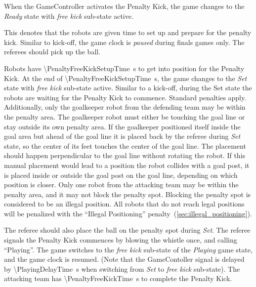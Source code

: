 When the GameController activates the Penalty Kick, the game changes to the \textit{Ready} state with \textit{free kick} sub-state active.

This denotes that the robots are given time to set up and prepare for the penalty kick.
Similar to kick-off, the game clock is \textit{paused} during finals games only.
The referees should pick up the ball.

Robots have \qty{\PenaltyFreeKickSetupTime}{\second} to get into position for the Penalty Kick. At the end of \qty{\PenaltyFreeKickSetupTime}{\second}, the game changes to the \textit{Set} state with \textit{free kick} sub-state active.
Similar to a kick-off, during the Set state the robots are waiting for the Penalty Kick to commence.
Standard penalties apply.
Additionally, only the goalkeeper robot from the defending team may be within the penalty area. The goalkeeper robot must either be touching the goal line or stay outside its own penalty area. If the goalkeeper positioned itself inside the goal area but ahead of the goal line it is placed back by the referee during \textit{Set} state, so the center of its feet touches the center of the goal line. The placement should happen perpendicular to the goal line without rotating the robot. If this manual placement would lead to a position the robot collides with a goal post, it is placed inside or outside the goal post on the goal line, depending on which position is closer.
Only one robot from the attacking team may be within the penalty area, and it may not block the penalty spot.
Blocking the penalty spot is considered to be an illegal position.
All robots that do not reach legal positions will be penalized with the ``Illegal Positioning'' penalty~(\cf \cref{sec:illegal_positioning}).

The referee should also place the ball on the penalty spot during \textit{Set}.
The referee signals the Penalty Kick commences by blowing the whistle once, and calling ``Playing''.
The game switches to the \textit{free kick} sub-state of the \textit{Playing} game state, and the game clock is resumed.
(Note that the GameContoller signal is delayed by \qty{\PlayingDelayTime}{\second} when switching from \textit{Set} to \textit{free kick} sub-state).
The attacking team has \qty{\PenaltyFreeKickTime}{\second} to complete the Penalty Kick.

